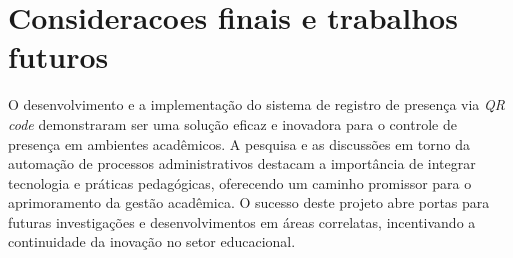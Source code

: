 \section{Consideracoes finais e trabalhos futuros}
\label{sec:consideracoes_finais_trabalhos_futuros}

O desenvolvimento e a implementação do sistema de registro de presença via \textit{QR code} demonstraram ser uma solução eficaz e inovadora para o controle de presença em ambientes acadêmicos. A pesquisa e as discussões em torno da automação de processos administrativos destacam a importância de integrar tecnologia e práticas pedagógicas, oferecendo um caminho promissor para o aprimoramento da gestão acadêmica. O sucesso deste projeto abre portas para futuras investigações e desenvolvimentos em áreas correlatas, incentivando a continuidade da inovação no setor educacional.
